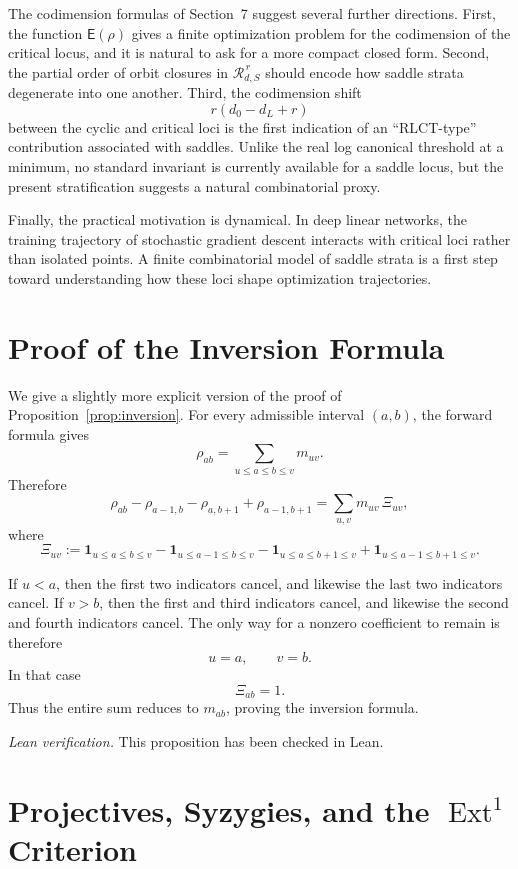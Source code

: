 \documentclass[11pt]{article}
\newcommand{\Ext}{\operatorname{Ext}}
\newcommand{\leanchecked}{\par\smallskip\noindent\emph{Lean verification.} This proposition has been checked in Lean.}
\theoremstyle{definition}
\begin{document}
The codimension formulas of Section~7 suggest several further directions.
First, the function \(\mathsf E(\rho)\) gives a finite optimization problem for
the codimension of the critical locus, and it is natural to ask for a more
compact closed form. Second, the partial order of orbit closures in
\(\mathcal R_{d,S}^{\,r}\) should encode how saddle strata degenerate into one
another. Third, the codimension shift
\[
r(d_0-d_L+r)
\]
between the cyclic and critical loci is the first indication of an
``RLCT-type'' contribution associated with saddles. Unlike the real log
canonical threshold at a minimum, no standard invariant is currently available
for a saddle locus, but the present stratification suggests a natural
combinatorial proxy.

Finally, the practical motivation is dynamical. In deep linear networks, the
training trajectory of stochastic gradient descent interacts with critical loci
rather than isolated points. A finite combinatorial model of saddle strata is a
first step toward understanding how these loci shape optimization trajectories.

\appendix

\section{Proof of the Inversion Formula}
\label{app:inversion}

We give a slightly more explicit version of the proof of
Proposition~\ref{prop:inversion}. For every admissible interval \((a,b)\), the
forward formula gives
\[
\rho_{ab}
=
\sum_{u\leq a\leq b\leq v} m_{uv}.
\]
Therefore
\[
\rho_{ab}-\rho_{a-1,b}-\rho_{a,b+1}+\rho_{a-1,b+1}
=
\sum_{u,v} m_{uv}\,\Xi_{uv},
\]
where
\[
\Xi_{uv}
:=
\mathbf 1_{u\leq a\leq b\leq v}
-\mathbf 1_{u\leq a-1\leq b\leq v}
-\mathbf 1_{u\leq a\leq b+1\leq v}
+\mathbf 1_{u\leq a-1\leq b+1\leq v}.
\]

If \(u<a\), then the first two indicators cancel, and likewise the last two
indicators cancel. If \(v>b\), then the first and third indicators cancel, and
likewise the second and fourth indicators cancel. The only way for a nonzero
coefficient to remain is therefore
\[
u=a,\qquad v=b.
\]
In that case
\[
\Xi_{ab}=1.
\]
Thus the entire sum reduces to \(m_{ab}\), proving the inversion formula.
\leanchecked

\section{Projectives, Syzygies, and the \texorpdfstring{\(\Ext^1\)}{Ext1} Criterion}
\label{app:ext}
\end{document}
